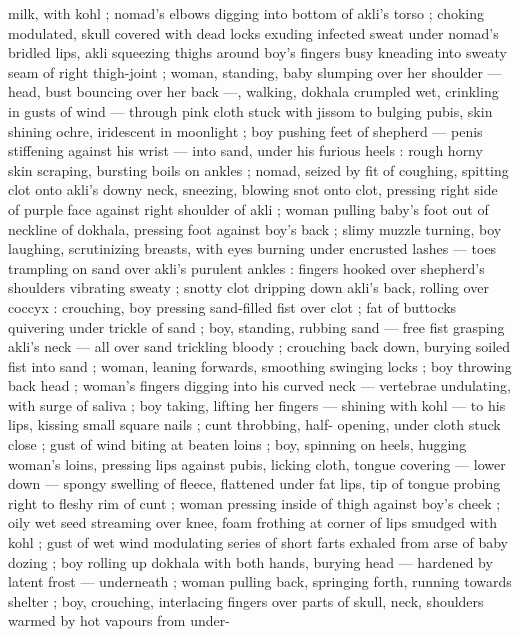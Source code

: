milk, with kohl ; nomad's elbows digging into bottom of akli's torso 
; choking modulated, skull covered with dead locks exuding infected 
sweat under nomad's bridled lips, akli squeezing thighs around boy's 
fingers busy kneading into sweaty seam of right thigh-joint ; woman, 
standing, baby slumping over her shoulder --- head, bust bouncing 
over her back ---, walking, dokhala crumpled wet, crinkling in gusts 
of wind --- through pink cloth stuck with jissom to bulging pubis, skin 
shining ochre, iridescent in moonlight ; boy pushing feet of shepherd 
--- penis stiffening against his wrist --- into sand, under his furious 
heels : rough horny skin scraping, bursting boils on ankles ; nomad, 
seized by fit of coughing, spitting clot onto akli's downy neck, 
sneezing, blowing snot onto clot, pressing right side of purple face 
against right shoulder of akli ; woman pulling baby's foot out of 
neckline of dokhala, pressing foot against boy's back ; slimy muzzle 
turning, boy laughing, scrutinizing breasts, with eyes burning under 
encrusted lashes --- toes trampling on sand over akli's purulent 
ankles : fingers hooked over shepherd's shoulders vibrating sweaty 
; snotty clot dripping down akli's back, rolling over coccyx : 
crouching, boy pressing sand-filled fist over clot ; fat of buttocks 
quivering under trickle of sand ; boy, standing, rubbing sand --- free 
fist grasping akli's neck --- all over sand trickling bloody ; crouching 
back down, burying soiled fist into sand ; woman, leaning forwards, 
smoothing swinging locks ; boy throwing back head ; woman's 
fingers digging into his curved neck --- vertebrae undulating, with 
surge of saliva ; boy taking, lifting her fingers --- shining with kohl 
--- to his lips, kissing small square nails ; cunt throbbing, half- 
opening, under cloth stuck close ; gust of wind biting at beaten loins 
; boy, spinning on heels, hugging woman's loins, pressing lips 
against pubis, licking cloth, tongue covering --- lower down --- 
spongy swelling of fleece, flattened under fat lips, tip of tongue 
probing right to fleshy rim of cunt ; woman pressing inside of thigh 
against boy's cheek ; oily wet seed streaming over knee, foam 
frothing at corner of lips smudged with kohl ; gust of wet wind 
modulating series of short farts exhaled from arse of baby dozing ; 
boy rolling up dokhala with both hands, burying head --- hardened 
by latent frost --- underneath ; woman pulling back, springing forth, 
running towards shelter ; boy, crouching, interlacing fingers over 
parts of skull, neck, shoulders warmed by hot vapours from under- 
